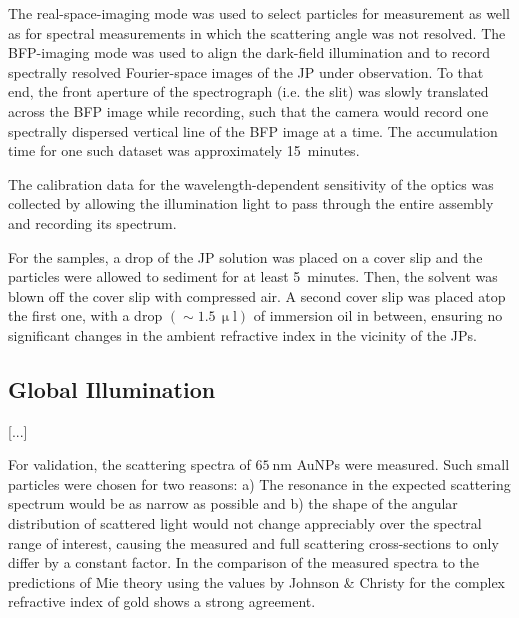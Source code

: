 \documentclass[10pt]{article}
\begin{document}
\begin{multicols}{2}
The real-space-imaging mode was used to select particles for measurement as well as for spectral measurements in which the scattering angle was not resolved. 
The BFP-imaging mode was used to align the dark-field illumination and to record spectrally resolved Fourier-space images of the JP under observation. 
To that end, the front aperture of the spectrograph (i.e. the slit) was slowly translated across the BFP image while recording, such that the camera would record one spectrally dispersed vertical line of the BFP image at a time. 
The accumulation time for one such dataset was approximately \mbox{15 minutes}.  

The calibration data for the wavelength-dependent sensitivity of the optics was collected by allowing the illumination light to pass through the entire assembly and recording its spectrum. 

For the samples, a drop of the JP solution was placed on a cover slip and the particles were allowed to sediment for at least \mbox{5 minutes}. 
Then, the solvent was blown off the cover slip with compressed air. 
A second cover slip was placed atop the first one, with a drop \mbox{$(\sim 1.5\,\mathrm{\upmu l})$} of immersion oil in between, ensuring no significant changes in the ambient refractive index in the vicinity of the JPs. 

\subsection*{Global Illumination}

[...]

For validation, the scattering spectra of $\SI{65}{\nano\meter}$ AuNPs were measured. 
Such small particles were chosen for two reasons: 
a) The resonance in the expected scattering spectrum would be as narrow as possible and b) the shape of the angular distribution of scattered light would not change appreciably over the spectral range of interest, causing the measured and full scattering cross-sections to only differ by a constant factor. 
In the comparison of the measured spectra to the predictions of Mie theory \cite{Mie1908, BohrenHuffman, GouesbetGrehan} using the values by Johnson \& Christy \cite{Johnson1972} for the complex refractive index of gold shows a strong agreement. 


\end{multicols}
\end{document}

